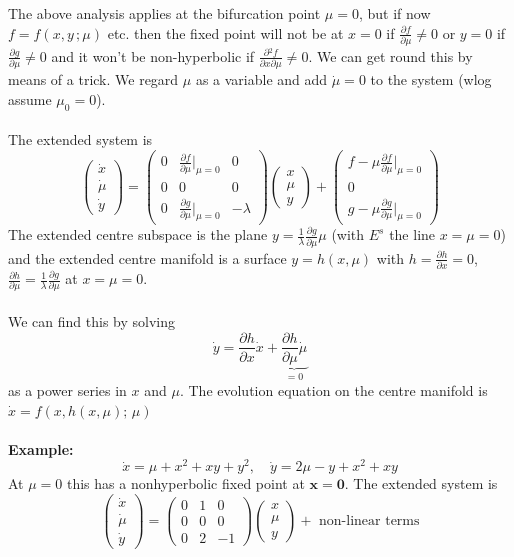 \documentclass{article}
\newcommand{\example}{\textbf{Example:}}                    %
\newcommand{\bx}{\bm{x}}                                    %
\newcommand{\pder}[2] {\frac{\partial {#1}}{\partial {#2} }}%
\begin{document}
The above analysis applies at the bifurcation point $\mu=0$, but if now
$f=f(x,y\, ;\mu)$ etc. then the fixed point will not be at $x=0$ if 
$\displaystyle \pder{f}{\mu} \neq 0$ or $y=0$ if 
$\displaystyle \pder{g}{\mu} \neq 0$ and it won't be non-hyperbolic if
$\displaystyle \pder{^2 f}{x \partial \mu} \neq 0$. We can get round this
by means of a trick. We regard $\mu$ as a variable and add $\dot{\mu}=0$ to
the system (wlog assume $\mu_0=0$).
\\
\\
The extended system is
\[ \left( \begin{array}{c} \dot{x} \\ \dot{\mu} \\ \dot{y} \end{array} \right) =
\left( \begin{array}{ccr} 
0 & \pder{f}{{\mu}}|_{\mu =0} & 0 \\ 
0 & 0 & 0 \\ 
0 & \pder{g}{{\mu}}|_{\mu =0} & -\lambda \end{array} \right) 
 \left( \begin{array}{c} x \\ \mu \\ y \end{array} \right) +
 \left( \begin{array}{c}
 f - \mu \pder{f}{\mu}|_{\mu=0} \\ 0 \\
 g - \mu \pder{g}{\mu}|_{\mu =0} \end{array} \right) 
\]
The extended centre subspace is the plane 
$\displaystyle y= \frac{1}{\lambda} \pder{ g}{ \mu} \mu $ (with $E^s$ the line
$x=\mu=0$) and the extended centre manifold is a surface $y = h(x,\mu)$ with
$\displaystyle h = \pder{h}{x} =0$, $\displaystyle \pder{h}{\mu} = \frac{1}{\lambda} 
\pder{g}{\mu}$ at $x=\mu=0$.
\\
\\
We can find this by solving
\[ \dot{y} = \pder{h}{x}\dot{x} + \underbrace{\pder{h}{\mu} \dot{\mu}}_
{=0} \]
as a power series in $x$ and $\mu$. The evolution equation on the centre
manifold is $\dot{x} = f(x,h(x,\mu);\, \mu)$
\\
\\
\example\ 
\[ \dot{x} = \mu + x^2 + xy +y^2, \quad \dot{y} = 2\mu - y + x^2 +xy \]
At $\mu =0$ this has a nonhyperbolic fixed point at $\bx = \bm{0}$.
The extended system is
\[ \left( \begin{array}{c} \dot{x} \\ \dot{\mu} \\ \dot{y} \end{array} \right) =
\left( \begin{array}{ccr} 
0 & 1 & 0 \\ 
0 & 0 & 0 \\ 
0 & 2 & -1 \end{array} \right) 
 \left( \begin{array}{c} x \\ \mu \\ y \end{array} \right) +
\mbox{ non-linear terms} \]
\end{document}
